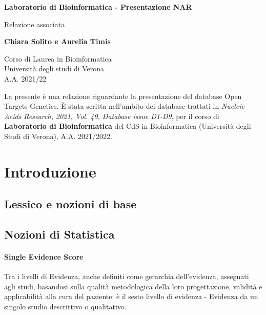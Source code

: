\documentclass{article}
\begin{document}
\newcommand\tab[1][0.3cm]{\hspace*{#1}}


\begin{titlepage}
    \begin{center}
        \vspace*{1cm}
            
        \Huge
        \textbf{Laboratorio di Bioinformatica - Presentazione NAR}
            
        \vspace{0.5cm}
        \LARGE
        Relazione associata
            
        \vspace{1.5cm}
            
        \textbf{Chiara Solito e Aurelia Timis}

        \vspace{0.8cm}

            
        \Large
        Corso di Laurea in Bioinformatica\\
        Università degli studi di Verona\\
        A.A. 2021/22
            
    \end{center}
\end{titlepage}
La presente è una relazione riguardante la presentazione del database Open Targets Genetics. È stata scritta nell'ambito dei database trattati in \textit{Nucleic Acids Research, 2021, Vol. 49, Database issue D1-D9}, per il corso di \textbf{Laboratorio di Bioinformatica} del CdS in Bioinformatica (Università degli Studi di Verona), A.A. 2021/2022.\\
\tableofcontents
\thispagestyle{empty}
\newpage
\thispagestyle{empty}
\section{Introduzione}
\subsection{Lessico e nozioni di base}
\subsection*{Nozioni di Statistica}
\paragraph{Single Evidence Score}
Tra i livelli di Evidenza, anche definiti come gerarchia dell'evidenza, assegnati agli studi, basandosi sulla qualità metodologica della loro progettazione, validità e applicabilità alla cura del paziente: è il sesto livello di evidenza - Evidenza da un singolo studio descrittivo o qualitativo.
\end{document}
